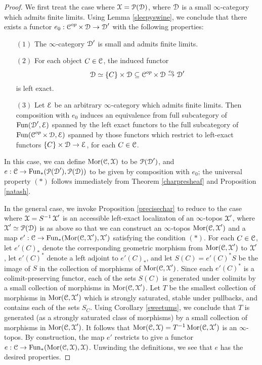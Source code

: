 \begin{proof}
We first treat the case where $\calX = \calP(\calD)$, where $\calD$ is a small $\infty$-category which admits finite limits. Using Lemma \ref{sleepyswine}, we conclude that there exists a functor
$e_0: \calC^{op} \times \calD \rightarrow \calD'$ with the following properties:
\begin{itemize}
\item[$(1)$] The $\infty$-category $\calD'$ is small and admits finite limits.
\item[$(2)$] For each object $C \in \calC$, the induced functor
$$ \calD \simeq \{ C \} \times \calD \subseteq \calC^{op} \times \calD \stackrel{e_0}{\rightarrow} \calD'$$
is left exact.
\item[$(3)$] Let $\calE$ be an arbitrary $\infty$-category which admits finite limits. Then
composition with $e_0$ induces an equivalence from full subcategory of $\Fun( \calD', \calE)$ spanned by the left exact functors to the full subcategory of $\Fun( \calC^{op} \times \calD, \calE)$ spanned by those functors which restrict to left-exact functors $\{ C \} \times \calD \rightarrow \calE$, for each $C \in \calC$.
\end{itemize}
In this case, we can define $\Mor(\calC, \calX)$ to be $\calP( \calD')$, and $e: \calC \rightarrow
\Fun_{\ast}( \calP( \calD'), \calP(\calD) )$ to be given by composition with $e_0$; the universal property
$(\ast)$ follows immediately from Theorem \ref{charpresheaf} and Proposition \ref{natash}.

In the general case, we invoke Proposition \ref{precisechar} to reduce to the case where
$\calX = S^{-1} \calX'$ is an accessible left-exact localizaton of an $\infty$-topos
$\calX'$, where $\calX' \simeq \calP(\calD)$ is as above so that we can
construct an $\infty$-topos $\Mor( \calC, \calX')$ and a map 
$e': \calC \rightarrow \Fun_{\ast}( \Mor(\calC, \calX'), \calX')$ satisfying the condition $(\ast)$.
For each $C \in \calC$, let $e'(C)_{\ast}$ denote the corresponding geometric morphism
from $\Mor(\calC, \calX')$ to $\calX'$, let $e'(C)^{\ast}$ denote a left adjoint to
$e'(C)_{\ast}$, and let $S(C) = e'(C)^{\ast} S$ be the image of $S$ in the collection of morphisms
of $\Mor(\calC, \calX')$. Since each $e'(C)^{\ast}$ is a colimit-preserving functor, each of the sets 
$S(C)$ is generated under colimits by a small collection of morphisms in $\Mor(\calC, \calX')$. Let $T$ be the smallest collection of morphisms in
$\Mor(\calC, \calX')$ which is strongly saturated, stable under pullbacks, and contains each of the sets $S_{C}$. Using Corollary \ref{sweetums}, we conclude that $T$ is generated (as a strongly saturated class of morphisms) by a small collection of morphisms in $\Mor(\calC, \calX')$. It follows that
$\Mor(\calC, \calX) = T^{-1} \Mor( \calC, \calX')$ is an $\infty$-topos. By construction,
the map $e'$ restricts to give a functor
$e: \calC \rightarrow \Fun_{\ast}( \Mor( \calC, \calX), \calX)$. Unwinding the definitions, we see that
$e$ has the desired properties.
\end{proof}

